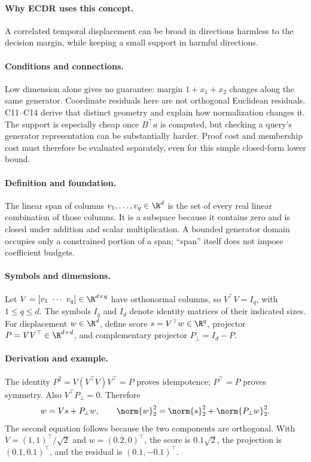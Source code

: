 \paragraph{Why ECDR uses this concept.}
A correlated temporal displacement can be broad in directions harmless to the decision margin, while keeping a small support in harmful directions.
\paragraph{Conditions and connections.}
Low dimension alone gives no guarantee: margin $1+x_1+x_2$ changes along the same generator. Coordinate residuals here are not orthogonal Euclidean residuals. C11--C14 derive that distinct geometry and explain how normalization changes it. The support is especially cheap once $B^\top a$ is computed, but checking a query's generator representation can be substantially harder. Proof cost and membership cost must therefore be evaluated separately, even for this simple closed-form lower bound.

\paragraph{Definition and foundation.}
The linear span of columns $v_1,\ldots,v_q\in\R^d$ is the set of every real linear combination of those columns. It is a subspace because it contains zero and is closed under addition and scalar multiplication. A bounded generator domain occupies only a constrained portion of a span; ``span'' itself does not impose coefficient budgets.
\paragraph{Symbols and dimensions.}
Let $V=[v_1\ \cdots\ v_q]\in\R^{d\times q}$ have orthonormal columns, so $V^\top V=I_q$, with $1\le q\le d$. The symbols $I_q$ and $I_d$ denote identity matrices of their indicated sizes. For displacement $w\in\R^d$, define score $s=V^\top w\in\R^q$, projector $P=VV^\top\in\R^{d\times d}$, and complementary projector $P_\perp=I_d-P$.
\paragraph{Derivation and example.}
The identity $P^2=V(V^\top V)V^\top=P$ proves idempotence; $P^\top=P$ proves symmetry. Also $V^\top P_\perp=0$. Therefore
\[
 w=Vs+P_\perp w,\qquad
 \norm{w}_2^2=\norm{s}_2^2+\norm{P_\perp w}_2^2.
\]
The second equation follows because the two components are orthogonal. With $V=(1,1)^\top/\sqrt2$ and $w=(0.2,0)^\top$, the score is $0.1\sqrt2$, the projection is $(0.1,0.1)^\top$, and the residual is $(0.1,-0.1)^\top$.

